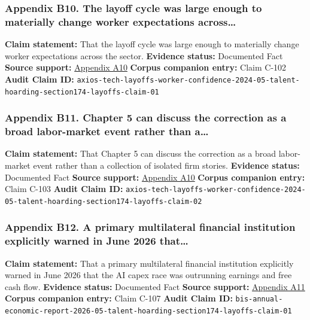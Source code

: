 \documentclass[
  american,
  11pt,
  letterpaper,
]{article}
\begin{document}
\subsubsection{Appendix B10. The layoff cycle was large enough to
materially change worker expectations
across\ldots{}}\label{appendix-b10-the-layoff-cycle-was-large-enough-to-materially-change-worker-expectations-across}

\textbf{Claim statement:} That the layoff cycle was large enough to
materially change worker expectations across the sector.
\textbf{Evidence status:} Documented Fact \textbf{Source support:}
\hyperref[appendix-a10-big-tech-layoffs-shattered-industry-worker-confidence]{Appendix
A10} \textbf{Corpus companion entry:} Claim C-102 \textbf{Audit Claim
ID:}
\texttt{axios-tech-layoffs-worker-confidence-2024-05-talent-hoarding-section174-layoffs-claim-01}

\subsubsection{Appendix B11. Chapter 5 can discuss the correction as a
broad labor-market event rather than
a\ldots{}}\label{appendix-b11-chapter-5-can-discuss-the-correction-as-a-broad-labor-market-event-rather-than-a}

\textbf{Claim statement:} That Chapter 5 can discuss the correction as a
broad labor-market event rather than a collection of isolated firm
stories. \textbf{Evidence status:} Documented Fact \textbf{Source
support:}
\hyperref[appendix-a10-big-tech-layoffs-shattered-industry-worker-confidence]{Appendix
A10} \textbf{Corpus companion entry:} Claim C-103 \textbf{Audit Claim
ID:}
\texttt{axios-tech-layoffs-worker-confidence-2024-05-talent-hoarding-section174-layoffs-claim-02}

\subsubsection{Appendix B12. A primary multilateral financial
institution explicitly warned in June 2026
that\ldots{}}\label{appendix-b12-a-primary-multilateral-financial-institution-explicitly-warned-in-june-2026-that}

\textbf{Claim statement:} That a primary multilateral financial
institution explicitly warned in June 2026 that the AI capex race was
outrunning earnings and free cash flow. \textbf{Evidence status:}
Documented Fact \textbf{Source support:}
\hyperref[appendix-a11-annual-economic-report-2026]{Appendix A11}
\textbf{Corpus companion entry:} Claim C-107 \textbf{Audit Claim ID:}
\texttt{bis-annual-economic-report-2026-05-talent-hoarding-section174-layoffs-claim-01}
\end{document}
